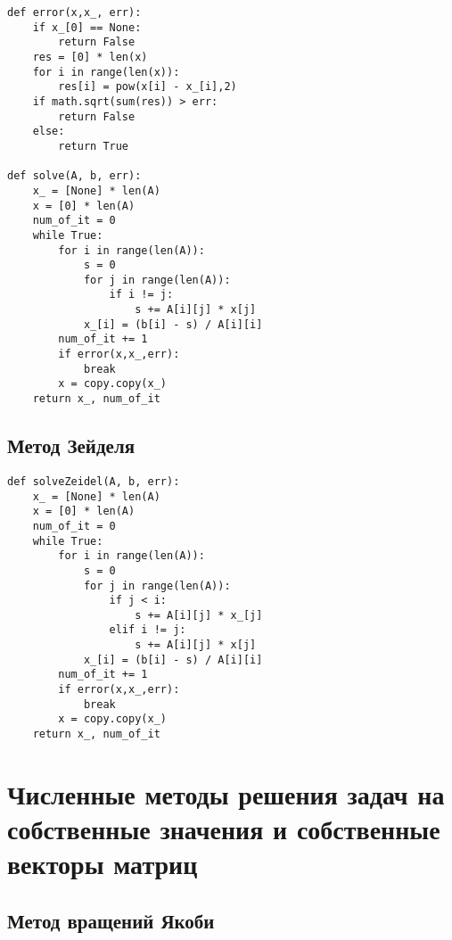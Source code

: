 \documentclass[pdf, unicode, 12pt, a4paper,oneside,fleqn]{article}
\begin{document}
\begin{lstlisting}
def error(x,x_, err):
    if x_[0] == None:
        return False
    res = [0] * len(x)
    for i in range(len(x)):
        res[i] = pow(x[i] - x_[i],2)
    if math.sqrt(sum(res)) > err:
        return False
    else:
        return True
        
def solve(A, b, err):
    x_ = [None] * len(A)
    x = [0] * len(A)
    num_of_it = 0
    while True:
        for i in range(len(A)):
            s = 0
            for j in range(len(A)):
                if i != j:
                    s += A[i][j] * x[j]
            x_[i] = (b[i] - s) / A[i][i]
        num_of_it += 1
        if error(x,x_,err):
            break
        x = copy.copy(x_)
    return x_, num_of_it
\end{lstlisting}

\subsection{Метод Зейделя}

\begin{lstlisting}
def solveZeidel(A, b, err):
    x_ = [None] * len(A)
    x = [0] * len(A)
    num_of_it = 0
    while True:
        for i in range(len(A)):
            s = 0
            for j in range(len(A)):
                if j < i:
                    s += A[i][j] * x_[j]
                elif i != j:
                    s += A[i][j] * x[j]
            x_[i] = (b[i] - s) / A[i][i]
        num_of_it += 1
        if error(x,x_,err):
            break
        x = copy.copy(x_)
    return x_, num_of_it
\end{lstlisting}

\section{Численные методы решения задач на собственные значения и собственные векторы матриц}

\subsection{Метод вращений Якоби}
\end{document}
